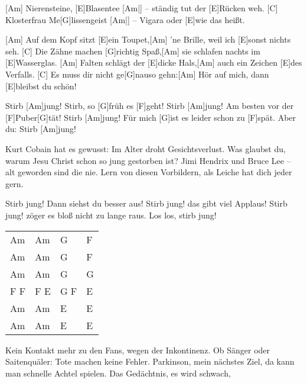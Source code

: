 

\begin{guitar}
	[Am] Nierensteine, [E]Blasentee [Am|]{ – }ständig tut der [E]Rücken weh.
	[C] Klosterfrau Me[G]lissengeist [Am|]{ – }Vigara oder [E]wie das heißt.
	
	[Am] Auf dem Kopf sitzt [E]ein Toupet,[Am] 'ne Brille, weil ich [E]sonst nichts seh.
	[C] Die Zähne machen [G]richtig Spaß,[Am] sie schlafen nachts im [E]Wasserglas.
	[Am] Falten schlägt der [E]dicke Hals,[Am] auch ein Zeichen [E]des Verfalls.
	[C] Es muss dir nicht ge[G]nauso gehn:[Am] Hör auf mich, dann [E]bleibst du schön!
	
	\begin{highlightbar}
		Stirb [Am]jung! Stirb, so [G]früh es [F]geht! Stirb [Am]jung! Am besten vor der [F]Puber[G]tät!
		Stirb [Am]jung! Für mich [G]ist es leider schon zu [F]spät. Aber du: Stirb [Am]jung!
	\end{highlightbar}
	
	\songsection{Strophe 2}
	Kurt Cobain hat es gewusst: Im Alter droht Gesichtsverlust.
	Was glaubst du, warum Jesu Christ schon so jung gestorben ist?
	Jimi Hendrix und Bruce Lee – alt geworden sind die nie.
	Lern von diesen Vorbildern, als Leiche hat dich jeder gern.
	
	\begin{highlightbar}
		\songsection{Refrain}
		Stirb jung! Dann siehst du besser aus! Stirb jung! das gibt viel Applaus!
		Stirb jung! zöger es bloß nicht zu lange raus. Los los, stirb jung!
	\end{highlightbar}
	
	{\footnotesize\begin{tabular}{|l|l|l|l|}
			Am & Am & G & F  \\
			Am & Am & G & F  \\
			Am & Am & G & G  \\
			F F & F E & G F & E \vspace{0.5em}\\
			Am & Am & E & E  \\
			Am & Am & E & E 
	\end{tabular}}
	
	Kein Kontakt mehr zu den Fans, wegen der Inkontinenz.
	Ob Sänger oder Saitenquäler: Tote machen keine Fehler.
	Parkinson, mein nächstes Ziel, da kann man schnelle Achtel spielen.
	Das Gedächtnis, es wird schwach, 
	

\end{guitar}
